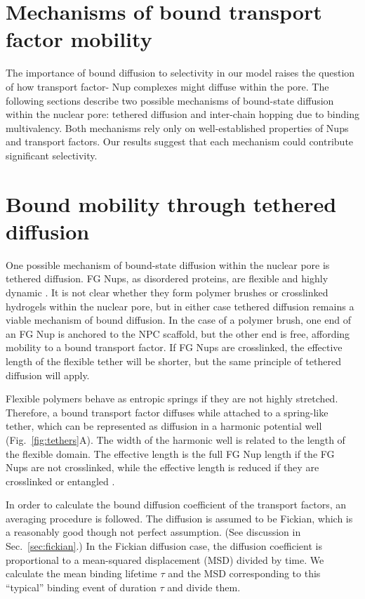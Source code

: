 \section{Mechanisms of  bound transport factor mobility}

The importance of bound diffusion to selectivity in our model raises the question of how transport factor- Nup complexes might diffuse within the pore.  The following sections describe two possible mechanisms of bound-state diffusion within the nuclear pore: tethered diffusion and inter-chain hopping due to binding multivalency.  Both mechanisms rely only on well-established properties of Nups and transport factors.  Our results suggest that each mechanism could contribute significant selectivity.

\section{Bound mobility through tethered diffusion}
\label{sec:tethered-diffusion}
One possible mechanism of bound-state diffusion within the nuclear pore is tethered diffusion.  FG Nups, as disordered proteins, are flexible and highly dynamic \cite{lim07, milles14, hough15,patel07}. It is not clear whether they form polymer brushes or crosslinked hydrogels within the nuclear pore, but in either case tethered diffusion remains a viable mechanism of bound diffusion.  In the case of a polymer brush, one end of an FG Nup is anchored to the NPC scaffold, but the other end is free, affording mobility to a bound transport factor.  If FG Nups are crosslinked, the effective length of the flexible tether will be shorter, but the same principle of tethered diffusion will apply.

Flexible polymers behave as entropic springs \cite{howard01} if they are not highly stretched. Therefore, a bound transport factor diffuses while attached to a spring-like tether, which can be represented as diffusion in a harmonic potential well (Fig.~\ref{fig:tethers}A).  The width of the harmonic well is related to the length of the flexible domain.  The effective length is the full FG Nup length if the FG Nups are not crosslinked, while the effective length is reduced if they are crosslinked or entangled \cite{ribbeck01}.  

In order to calculate the bound diffusion coefficient of the transport factors, an averaging procedure is followed.  The diffusion is assumed to be Fickian, which is a reasonably good though not perfect assumption. (See discussion in Sec.~\ref{sec:fickian}.)  In the Fickian diffusion case, the diffusion coefficient is proportional to a mean-squared displacement (MSD) divided by time.  We calculate the mean binding lifetime $\tau$ and the MSD corresponding to this ``typical'' binding event of duration $\tau$ and divide them.

